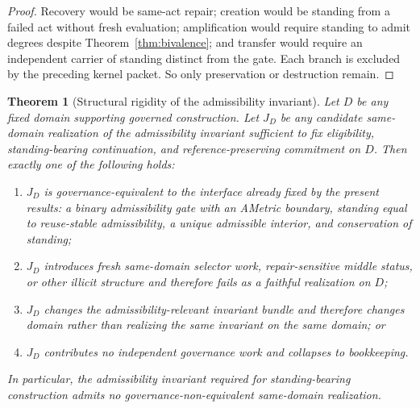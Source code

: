\documentclass[11pt]{article}
\newtheorem{theorem}{Theorem}[section]
\theoremstyle{definition}
\theoremstyle{remark}
\begin{document}
\begin{proof}
Recovery would be same-act repair; creation would be standing from a failed act without fresh evaluation; amplification would require standing to admit degrees despite Theorem~\ref{thm:bivalence}; and transfer would require an independent carrier of standing distinct from the gate. Each branch is excluded by the preceding kernel packet. So only preservation or destruction remain.
\end{proof}

\begin{theorem}[Structural rigidity of the admissibility invariant]\label{thm:rigidity}
Let $D$ be any fixed domain supporting governed construction. Let $J_D$ be any candidate same-domain realization of the admissibility invariant sufficient to fix eligibility, standing-bearing continuation, and reference-preserving commitment on $D$. Then exactly one of the following holds:
\begin{enumerate}[label=(\roman*)]
\item $J_D$ is governance-equivalent to the interface already fixed by the present results: a binary admissibility gate with an AMetric boundary, standing equal to reuse-stable admissibility, a unique admissible interior, and conservation of standing;
\item $J_D$ introduces fresh same-domain selector work, repair-sensitive middle status, or other illicit structure and therefore fails as a faithful realization on $D$;
\item $J_D$ changes the admissibility-relevant invariant bundle and therefore changes domain rather than realizing the same invariant on the same domain; or
\item $J_D$ contributes no independent governance work and collapses to bookkeeping.
\end{enumerate}
In particular, the admissibility invariant required for standing-bearing construction admits no governance-non-equivalent same-domain realization.
\end{theorem}
\end{document}
